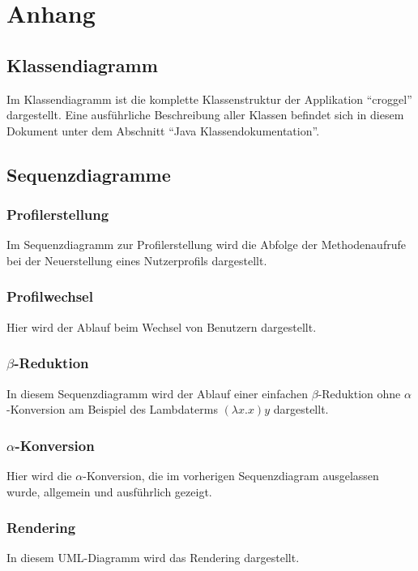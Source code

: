 \chapter{Anhang}
\section{Klassendiagramm}
	Im Klassendiagramm ist die komplette Klassenstruktur der Applikation "`croggel"' dargestellt. 
	Eine ausführliche Beschreibung aller Klassen befindet sich in diesem Dokument unter dem Abschnitt "`Java Klassendokumentation"'. 

\section{Sequenzdiagramme}
	\subsection{Profilerstellung}
		Im Sequenzdiagramm zur Profilerstellung wird die Abfolge der Methodenaufrufe bei der Neuerstellung eines Nutzerprofils dargestellt.

	\subsection{Profilwechsel}
		Hier wird der Ablauf beim Wechsel von Benutzern dargestellt.

	\subsection{\(\beta\)-Reduktion}
		In diesem Sequenzdiagramm wird der Ablauf einer einfachen \(\beta\)-Reduktion ohne \(\alpha\)-Konversion am Beispiel des Lambdaterms \((\lambda x.x) y\) dargestellt.

	\subsection{\(\alpha\)-Konversion}
		Hier wird die \(\alpha\)-Konversion, die im vorherigen Sequenzdiagram ausgelassen wurde, allgemein und ausführlich gezeigt.  

	\subsection{Rendering}
		In diesem UML-Diagramm wird das Rendering dargestellt.
